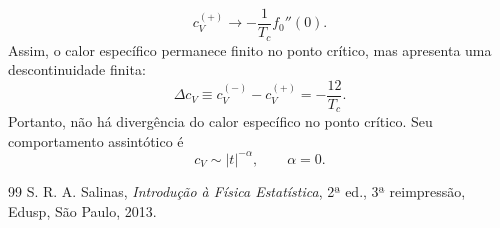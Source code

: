\documentclass[11pt,a4paper]{article}
\begin{document}
%
\begin{equation}
    \boxed{
    c_V^{(+)}
    \longrightarrow
    -\frac{1}{T_c}f_0''(0).
    }
    \label{eq:cv_plus_final}
\end{equation}
%
Assim, o calor específico permanece finito no ponto crítico, mas
apresenta uma descontinuidade finita:
%
\begin{equation}
    \boxed{
    \Delta c_V
    \equiv
    c_V^{(-)}-c_V^{(+)}
    =
    -\frac{12}{T_c}.
    }
\end{equation}
%
Portanto, não há divergência do calor específico no ponto crítico.
Seu comportamento assintótico é
%
\begin{equation}
    \boxed{
    c_V\sim |t|^{-\alpha},
    \qquad
    \alpha=0.
    }
\end{equation}
%
%

%
%
%
%
%
\begin{thebibliography}{99}
 S. R. A. Salinas, \emph{Introdução à Física Estatística}, 2ª ed., 3ª reimpressão, Edusp, São Paulo, 2013.
\end{thebibliography}
\end{document}
